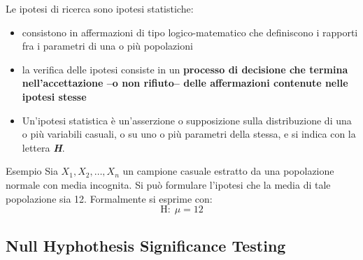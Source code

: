 \documentclass[compress, xcolor=table]{beamer}
\begin{document}
	\begin{frame}
		Le ipotesi di ricerca sono ipotesi statistiche:
		
		\begin{itemize}
			\item 	consistono in affermazioni di tipo logico-matematico che definiscono i rapporti fra i parametri di una o più popolazioni
			
			\item la verifica delle ipotesi consiste in un \textbf{processo di decisione che termina nell’accettazione --o non rifiuto-- delle affermazioni contenute nelle ipotesi stesse}
			
			\item Un’ipotesi statistica è un’asserzione o supposizione sulla distribuzione di una o più variabili casuali, o su uno o più parametri della stessa, e si indica con la lettera \emph{\textbf{H}}.
			
		\end{itemize}
		
		\begin{exampleblock}{Esempio}
			Sia $X_1,X_2,…,X_n$ un campione casuale estratto da una popolazione normale con media incognita.  Si può formulare l’ipotesi che la media di tale popolazione sia 12.  Formalmente si esprime con: 
			\begin{equation*}
				\text{H}:\; \mu = 12
			\end{equation*}
		\end{exampleblock}
	\end{frame}
	
	\subsection[NHST]{Null Hyphothesis Significance Testing}
	
\end{document}

